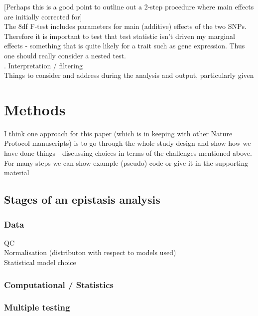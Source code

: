 \documentclass{article}
\begin{document}
[Perhaps this is a good point to outline out a 2-step procedure where main effects are initially corrected for] \\
The 8df F-test includes parameters for main (additive) effects of the two SNPs. Therefore it is important to test that test statistic isn't driven my marginal effects - something that is quite likely for a trait such as gene expression. Thus one should really consider a nested test.  \\
. Interpretation / filtering \\
\newline
Things to consider and address during the analysis and output, particularly given    
\newline
\section{Methods}

I think one approach for this paper (which is in keeping with other Nature Protocol manuscripts) is to go through the whole study design and show how we have done things - discussing choices in terms of the challenges mentioned above. For many steps we can show example (pseudo) code or give it in the supporting material  

\subsection{Stages of an epistasis analysis}

\subsubsection{Data}

QC \\
Normalisation (distributon with respect to models used) \\
Statistical model choice \\

\subsubsection{Computational / Statistics}



\subsubsection{Multiple testing}
\end{document}
